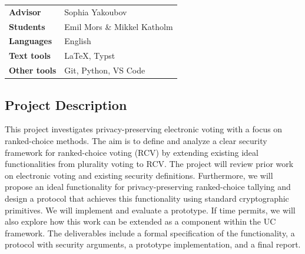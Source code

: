 \documentclass{article}
\begin{document}
\pagestyle{fancy}

\bgroup{}
\begin{table}[h]
\begin{tabular}{ll}
\textbf{Advisor}     & Sophia Yakoubov  \\
\textbf{Students}    & Emil Mors \& Mikkel Katholm  \\
\textbf{Languages}   & English \\
\textbf{Text tools}  & \LaTeX, Typst         \\
\textbf{Other tools} & Git, Python, VS Code
\end{tabular}
\end{table}
\egroup\vspace{-0.cm}

\subsection*{Project Description}
This project investigates privacy-preserving electronic voting with a focus on ranked-choice methods. The aim is to define and analyze a clear security framework for ranked-choice voting (RCV) by extending existing ideal functionalities from plurality voting to RCV. The project will review prior work on electronic voting and existing security definitions. Furthermore, we will propose an ideal functionality for privacy-preserving ranked-choice tallying and design a protocol that achieves this functionality using standard cryptographic primitives. We will implement and evaluate a prototype. If time permits, we will also explore how this work can be extended as a component within the UC framework. The deliverables include a formal specification of the functionality, a protocol with security arguments, a prototype implementation, and a final report.
\end{document}
